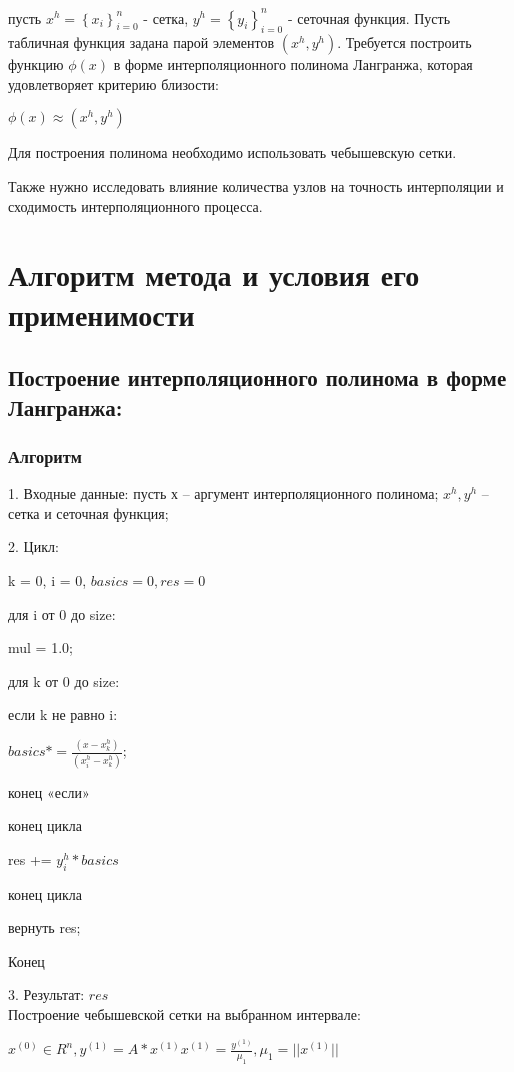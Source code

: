 \documentclass{article}
\begin{document}
	пусть $x^h = \left\{x_i\right\}^n_{i=0}$ - сетка, $y^h = \left\{y_i\right\}^n_{i=0}$ - сеточная функция. Пусть табличная функция задана парой элементов $(x^h,y^h)$. Требуется построить функцию $\phi(x)$ в форме интерполяционного полинома Лангранжа, которая удовлетворяет критерию близости:
	
	$\phi(x) \approx (x^h,y^h)$
	
	Для построения полинома необходимо использовать чебышевскую сетки.
	
	Также нужно исследовать влияние количества узлов на точность интерполяции и сходимость интерполяционного процесса.
	
	\section{Алгоритм метода и условия его применимости}   
	
	\subsection{Построение интерполяционного полинома в форме Лангранжа:}
	\subsubsection{Алгоритм}
	1. Входные данные: пусть х – аргумент интерполяционного полинома; $x^h,y^h$ – сетка и сеточная функция;  
	
	2. Цикл:
	
	k = 0, i = 0, $basics = 0, res = 0$
	
	для i от 0 до size: 
	
	\quad mul = 1.0;
	
	\quad для k от 0 до size:
		
	\qquad если k не равно i:
				
	\quad \qquad $basics *=\frac{(x - x^h_k)}{(x^h_i-x^h_k)}$;
			
	\qquad конец «если»
		
	\quad конец цикла
		
	\quad res += $y^h_i * basics$
	
	конец цикла
	
	вернуть res;

	
	Конец
	
	3. Результат: $res$
	~\\
	
	Построение чебышевской сетки на выбранном интервале:
	
	$x^{(0)} \in R^n,y^{(1)} = A*x^{(1)} x^{(1)} = \frac{y^{(1)}}{\mu_1}, \mu_1 = ||x^{(1)}||$
	
\end{document}
